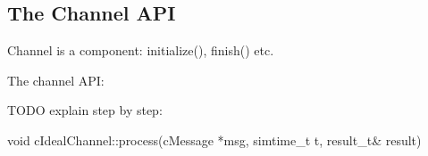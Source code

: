 \subsection{The Channel API}

Channel is a component: initialize(), finish() etc.

The channel API:


%
%

TODO explain step by step:

\begin{cpp}
void cIdealChannel::process(cMessage *msg, simtime_t t, result_t& result)
{
}
\end{cpp}

